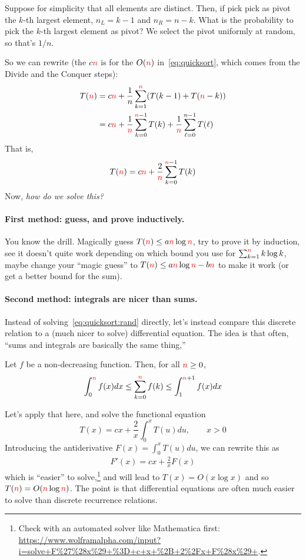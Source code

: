 Suppose for simplicity that all elements are distinct. Then, if pick pick as pivot the $k$-th largest element, $n_L=k-1$ and $n_R = n-k$. What is the probability to pick the $k$-th largest element as pivot? We select the pivot uniformly at random, so that's $1/n$.

So we can rewrite (the $c{\textcolor{red}{n}}$ is for the $O({\textcolor{red}{n}})$ in~\eqref{eq:quicksort}, which comes from the Divide and the Conquer steps): 
\begin{align*}
 T({\textcolor{red}{n}}) &= c {\textcolor{red}{n}} + \frac{1}{n}\sum_{k=1}^{{\textcolor{red}{n}}} (T(k-1)+T({\textcolor{red}{n}}-k) ) \\
&= c {\textcolor{red}{n}} + \frac{1}{{\textcolor{red}{n}}}\sum_{k=0}^{{\textcolor{red}{n}}-1} {T(k)}+ \frac{1}{{\textcolor{red}{n}}}\sum_{\ell=0}^{n-1} {T(\ell)}
\end{align*}
That is,
\begin{align}
\label{eq:quicksort:rand}
T({\textcolor{red}{n}}) = c {\textcolor{red}{n}} + \frac{2}{{\textcolor{red}{n}}}\sum_{k=0}^{{\textcolor{red}{n}}-1} {T(k)}
\end{align}
Now, \emph{how do we solve this?}

\paragraph{First method: guess, and prove inductively.}
You know the drill. Magically guess $T({\textcolor{red}{n}}) \leq a{\textcolor{red}{n}}\log{\textcolor{red}{n}}$, try to prove it by induction, see it doesn't quite work depending on which bound you use for $\sum_{k=1}^{\textcolor{red}{n}} k\log k$, maybe change your ``magic guess'' to $T({\textcolor{red}{n}}) \leq a{\textcolor{red}{n}}\log{\textcolor{red}{n}} - b{\textcolor{red}{n}}$ to make it work (or get a better bound for the sum).

\paragraph{Second method: integrals are nicer than sums.}
Instead of solving~\cref{eq:quicksort:rand} directly, let's instead compare this discrete relation to a (much nicer to solve) differential equation. The idea is that often, ``sums and integrals are basically the same thing,''
\begin{fact}
    Let $f$ be a non-decreasing function. Then, for all ${\textcolor{red}{n}} \geq 0$,
    \[
        \int_0^{\textcolor{red}{n}} f(x)dx \leq \sum_{k=0}^{\textcolor{red}{n}} f(k) \leq \int_1^{{\textcolor{red}{n}}+1} f(x)dx
    \]
\end{fact}
Let's apply that here, and solve the functional equation
\[
T(x) = cx + \frac{2}{x}\int_{0}^x T(u) du, \qquad x>0
\]
Introducing the antiderivative $F(x) = \int_{0}^x T(u) du$, we can rewrite this as 
\begin{align}
\label{eq:quicksort:diff:eq}
F'(x) = cx + \frac{2}{x}F(x)
\end{align}
which is ``easier'' to solve,\footnote{Check with an automated solver like Mathematica first: \url{https://www.wolframalpha.com/input?i=solve+F\%27\%28x\%29+\%3D+c+x+\%2B+2\%2Fx+F\%28x\%29+}.} and will lead to $T(x) = O(x \log x)$ and so $T({\textcolor{red}{n}}) = O({\textcolor{red}{n}}\log{\textcolor{red}{n}})$. The point is that differential equations are often much easier to solve than discrete recurrence relations.

